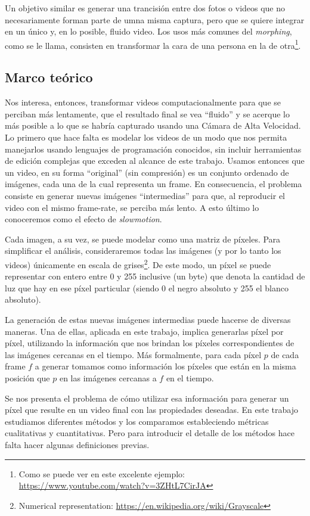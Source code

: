Un objetivo similar es generar una trancisión entre dos fotos o videos que no necesariamente forman parte de umna misma captura, pero que se quiere integrar en un único y, en lo posible, fluido video. Los usos más comunes del \emph{morphing}, como se le llama, consisten en transformar la cara de una persona en la de otra\footnote{Como se puede ver en este excelente ejemplo: \url{https://www.youtube.com/watch?v=3ZHtL7CirJA}}.

\subsection{Marco teórico}
Nos interesa, entonces, transformar videos computacionalmente para que se perciban más lentamente, que el resultado final se vea ``fluido'' y se acerque lo más posible a lo que se habría capturado usando una Cámara de Alta Velocidad. Lo primero que hace falta es modelar los videos de un modo que nos permita manejarlos usando lenguajes de programación conocidos, sin incluir herramientas de edición complejas que exceden al alcance de este trabajo. Usamos entonces que un video, en su forma ``original'' (sin compresión) es un conjunto ordenado de imágenes, cada una de la cual representa un frame. En consecuencia, el problema consiste en generar nuevas imágenes ``intermedias'' para que, al reproducir el video con el mismo frame-rate, se perciba más lento. A esto \'ultimo lo conoceremos como el efecto de \emph{slowmotion}.

Cada imagen, a su vez, se puede modelar como una matriz de píxeles. Para simplificar el análisis, consideraremos todas las imágenes (y por lo tanto los videos) únicamente en escala de grises\footnote{Numerical representation: \url{https://en.wikipedia.org/wiki/Grayscale}}. De este modo, un píxel se puede representar con entero entre 0 y 255 inclusive (un byte) que denota la cantidad de luz que hay en ese píxel particular (siendo 0 el negro absoluto y 255 el blanco absoluto).

La generación de estas nuevas imágenes intermedias puede hacerse de diversas maneras. Una de ellas, aplicada en este trabajo, implica generarlas píxel por píxel, utilizando la información que nos brindan los píxeles correspondientes de las imágenes cercanas en el tiempo. Más formalmente, para cada píxel $p$ de cada frame $f$ a generar tomamos como información los píxeles que están en la misma posición que $p$ en las imágenes cercanas a $f$ en el tiempo.

Se nos presenta el problema de cómo utilizar esa información para generar un píxel que resulte en un video final con las propiedades deseadas. En este trabajo estudiamos diferentes métodos y los comparamos estableciendo métricas cualitativas y cuantitativas. Pero para introducir el detalle de los métodos hace falta hacer algunas definiciones previas.

